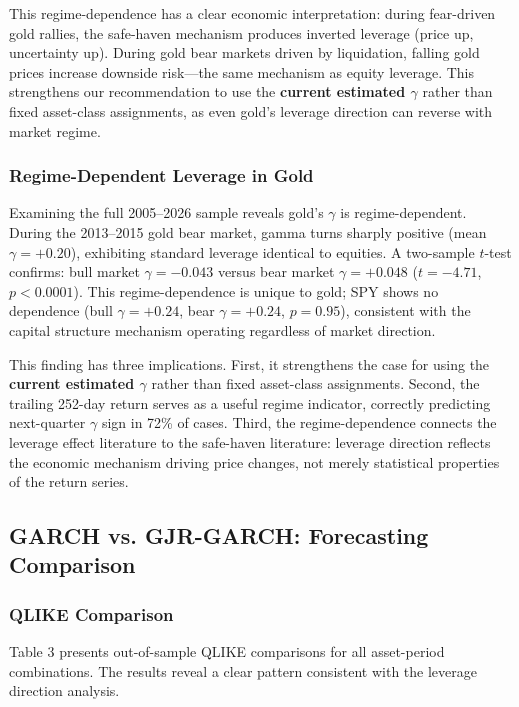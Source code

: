 This regime-dependence has a clear economic interpretation: during fear-driven gold rallies, the safe-haven mechanism produces inverted leverage (price up, uncertainty up). During gold bear markets driven by liquidation, falling gold prices increase downside risk---the same mechanism as equity leverage. This strengthens our recommendation to use the \textbf{current estimated $\gamma$} rather than fixed asset-class assignments, as even gold's leverage direction can reverse with market regime.


\subsubsection{Regime-Dependent Leverage in Gold}

Examining the full 2005--2026 sample reveals gold's $\gamma$ is regime-dependent. During the 2013--2015 gold bear market, gamma turns sharply positive (mean $\gamma = +0.20$), exhibiting standard leverage identical to equities. A two-sample $t$-test confirms: bull market $\gamma = -0.043$ versus bear market $\gamma = +0.048$ ($t = -4.71$, $p < 0.0001$). This regime-dependence is unique to gold; SPY shows no dependence (bull $\gamma = +0.24$, bear $\gamma = +0.24$, $p = 0.95$), consistent with the capital structure mechanism operating regardless of market direction.

This finding has three implications. First, it strengthens the case for using the \textbf{current estimated $\gamma$} rather than fixed asset-class assignments. Second, the trailing 252-day return serves as a useful regime indicator, correctly predicting next-quarter $\gamma$ sign in 72\% of cases. Third, the regime-dependence connects the leverage effect literature to the safe-haven literature: leverage direction reflects the economic mechanism driving price changes, not merely statistical properties of the return series.


\subsection{GARCH vs. GJR-GARCH: Forecasting Comparison}

\subsubsection{QLIKE Comparison}

Table 3 presents out-of-sample QLIKE comparisons for all asset-period combinations. The results reveal a clear pattern consistent with the leverage direction analysis.

